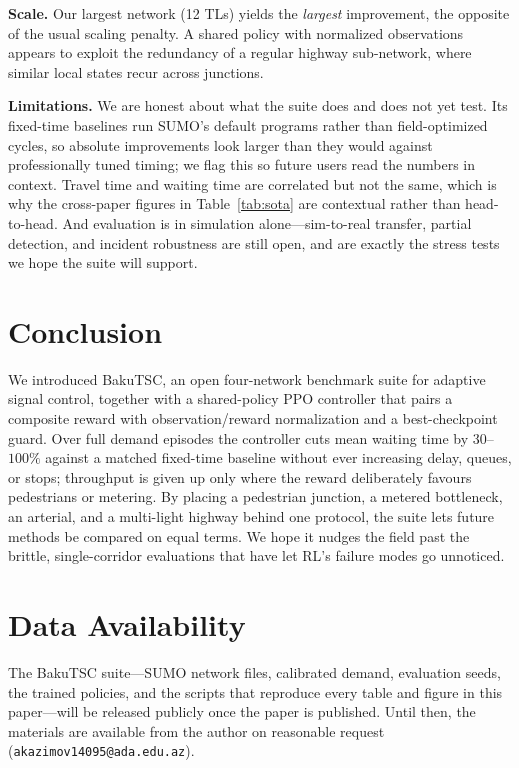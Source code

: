 \documentclass[conference,a4paper]{IEEEtran}
\begin{document}
\textbf{Scale.}
Our largest network (12 TLs) yields the \emph{largest} improvement, the opposite
of the usual scaling penalty. A shared policy with normalized observations
appears to exploit the redundancy of a regular highway sub-network, where similar
local states recur across junctions.

\textbf{Limitations.}
We are honest about what the suite does and does not yet test. Its fixed-time
baselines run SUMO's default programs rather than field-optimized cycles, so
absolute improvements look larger than they would against professionally tuned
timing; we flag this so future users read the numbers in context. Travel time and
waiting time are correlated but not the same, which is why the cross-paper figures
in Table~\ref{tab:sota} are contextual rather than head-to-head. And evaluation is
in simulation alone---sim-to-real transfer, partial detection, and incident
robustness are still open, and are exactly the stress tests we hope the suite will
support.

\section{Conclusion}
We introduced BakuTSC, an open four-network benchmark suite for adaptive signal
control, together with a shared-policy PPO controller that pairs a composite
reward with observation/reward normalization and a best-checkpoint guard. Over
full demand episodes the controller cuts mean waiting time by $30$--$100\%$
against a matched fixed-time baseline without ever increasing delay, queues, or
stops; throughput is given up only where the reward deliberately favours
pedestrians or metering. By placing a pedestrian junction, a metered bottleneck,
an arterial, and a multi-light highway behind one protocol, the suite lets future
methods be compared on equal terms. We hope it nudges the field past the brittle,
single-corridor evaluations that have let RL's failure modes go unnoticed.

\section{Data Availability}
\label{sec:data}
The BakuTSC suite---SUMO network files, calibrated demand, evaluation seeds, the
trained policies, and the scripts that reproduce every table and figure in this
paper---will be released publicly once the paper is published. Until then, the
materials are available from the author on reasonable request
(\texttt{akazimov14095@ada.edu.az}).



\end{document}
